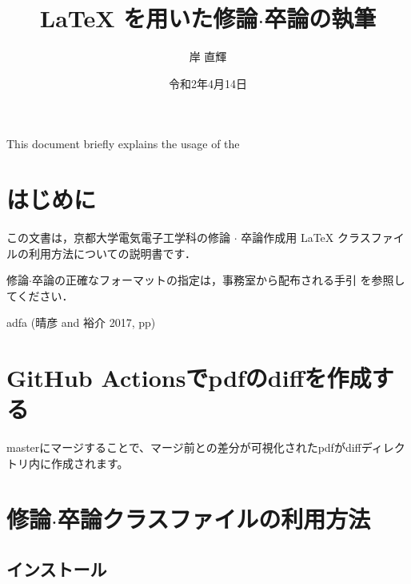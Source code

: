 \documentclass[
  sotsuron]{kuee}
\title{LaTeX を用いた修論$\cdot$卒論の執筆}
\author{岸 直輝}
\date{令和2年4月14日}
\date{}
\begin{document}
\maketitle

\begin{eabstract}This document briefly explains the usage of the\end{eabstract}

\def\lstlistingname{ソースコード}

{
        \setcounter{tocdepth}{2}
    \tableofcontents
  }
\hypertarget{ux306fux3058ux3081ux306b}{%
\chapter{はじめに}\label{ux306fux3058ux3081ux306b}}

\label{chap:intro}

この文書は，京都大学電気電子工学科の修論 \(\cdot\) 卒論作成用 \LaTeX
クラスファイルの利用方法についての説明書です．

修論\(\cdot\)卒論の正確なフォーマットの指定は，事務室から配布される手引
を参照してください．

\cite{GuideBook}

adfa (晴彦 and 裕介 2017, pp)

\hypertarget{github-actionsux3067pdfux306ediffux3092ux4f5cux6210ux3059ux308b}{%
\chapter{GitHub
Actionsでpdfのdiffを作成する}\label{github-actionsux3067pdfux306ediffux3092ux4f5cux6210ux3059ux308b}}

masterにマージすることで、マージ前との差分が可視化されたpdfがdiffディレクトリ内に作成されます。

\hypertarget{ux4feeux8ad6cdotux5352ux8ad6ux30afux30e9ux30b9ux30d5ux30a1ux30a4ux30ebux306eux5229ux7528ux65b9ux6cd5}{%
\chapter{\texorpdfstring{修論\(\cdot\)卒論クラスファイルの利用方法}{修論\textbackslash cdot卒論クラスファイルの利用方法}}\label{ux4feeux8ad6cdotux5352ux8ad6ux30afux30e9ux30b9ux30d5ux30a1ux30a4ux30ebux306eux5229ux7528ux65b9ux6cd5}}

\hypertarget{ux30a4ux30f3ux30b9ux30c8ux30fcux30eb}{%
\section{インストール}\label{ux30a4ux30f3ux30b9ux30c8ux30fcux30eb}}
\end{document}
